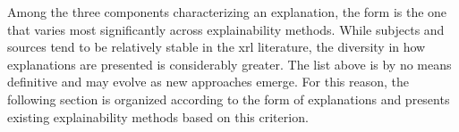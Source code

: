 Among the three components characterizing an explanation, the form is the one that varies most significantly across explainability methods.
While subjects and sources tend to be relatively stable in the \gls{xrl} literature, the diversity in how explanations are presented is considerably greater.
The list above is by no means definitive and may evolve as new approaches emerge.
For this reason, the following section is organized according to the form of explanations and presents existing explainability methods based on this criterion.
